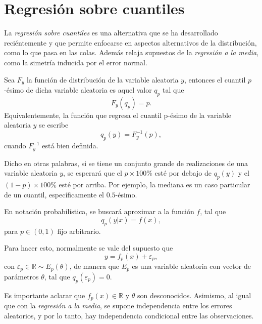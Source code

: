 \section{Regresión sobre cuantiles}

La \textit{regresi\'on sobre cuantiles} es una alternativa que se ha desarrollado reci\'entemente y que permite enfocarse en aspectos alternativos de la distribuci\'on, como lo que pasa en las colas. Adem\'as relaja supuestos de la \textit{regresi\'on a la media}, como la simetr\'ia inducida por el error normal.

\begin{defin}
Sea $F_y$ la funci\'on de distribuci\'on de la variable aleatoria $y$, entonces el cuantil $p$-\'esimo de dicha variable aleatoria es aquel valor $q_p$ tal que
\begin{equation*}
    F_y(q_p) = p.
\end{equation*}
Equivalentemente, la funci\'on que regresa el cuantil p-\'esimo de la variable aleatoria $y$ se escribe
\begin{equation*}
    q_p(y) = F_y^{-1}(p),
\end{equation*}
cuando $F_y^{-1}$ est\'a bien definida.
\end{defin}
Dicho en otras palabras, si se tiene un conjunto grande de realizaciones de una variable aleatoria $y$, se esperar\'a que el $p \times 100\%$ est\'e por debajo de $q_p(y)$ y el $(1-p) \times 100\%$ est\'e por arriba. Por ejemplo, la mediana es un caso particular de un cuantil, espec\'ificamente el $0.5$-\'esimo. 

En notaci\'on probabil\'istica, se buscar\'a aproximar a la funci\'on $f$, tal que 
\begin{equation*}
    q_p(y|x) = f(x),
\end{equation*}
para $p \in (0,1)$ fijo arbitrario.

Para hacer esto, normalmente se vale del supuesto que
\begin{equation*}
    y = f_p(x) + \varepsilon_p,
\end{equation*}
con $\varepsilon_p \in \mathbb{R} \sim E_p(\theta)$, de manera que $E_p$ es una variable aleatoria con vector de par\'ametros $\theta$, tal que $q_p(\varepsilon_p) = 0$. 

Es importante aclarar que $f_p(x) \in \mathbb{R}$ y $\theta$ son desconocidos. Asimismo, al igual que con la \textit{regresi\'on a la media}, se supone independencia entre los errores aleatorios, y por lo tanto, hay independencia condicional entre las observaciones.

